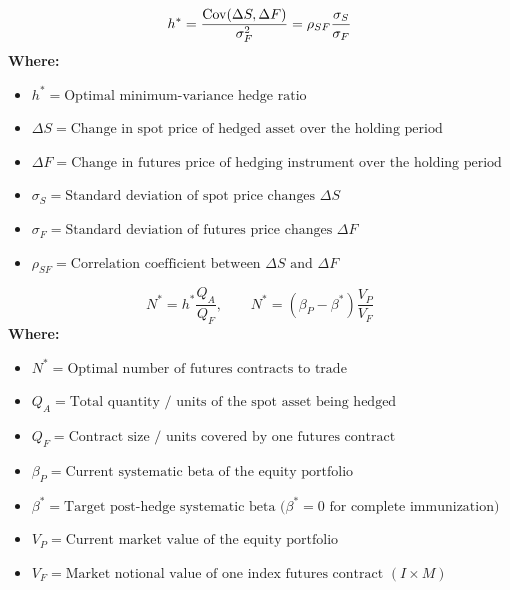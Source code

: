 \begin{formulabox}
\begin{equation}
h^* = \frac{\operatorname{Cov}(\Delta S, \Delta F)}{\sigma_F^2} = \rho_{SF} \frac{\sigma_S}{\sigma_F}
\end{equation}
\textbf{Where:}
\begin{itemize}[noitemsep, topsep=2pt]
    \item $h^* = \text{Optimal minimum-variance hedge ratio}$
    \item $\Delta S = \text{Change in spot price of hedged asset over the holding period}$
    \item $\Delta F = \text{Change in futures price of hedging instrument over the holding period}$
    \item $\sigma_S = \text{Standard deviation of spot price changes } \Delta S$
    \item $\sigma_F = \text{Standard deviation of futures price changes } \Delta F$
    \item $\rho_{SF} = \text{Correlation coefficient between } \Delta S \text{ and } \Delta F$
\end{itemize}
\end{formulabox}

\begin{formulabox}
\begin{equation}
N^* = h^* \frac{Q_A}{Q_F}, \qquad N^* = (\beta_P - \beta^*) \frac{V_P}{V_F}
\end{equation}
\textbf{Where:}
\begin{itemize}[noitemsep, topsep=2pt]
    \item $N^* = \text{Optimal number of futures contracts to trade}$
    \item $Q_A = \text{Total quantity / units of the spot asset being hedged}$
    \item $Q_F = \text{Contract size / units covered by one futures contract}$
    \item $\beta_P = \text{Current systematic beta of the equity portfolio}$
    \item $\beta^* = \text{Target post-hedge systematic beta ($\beta^* = 0$ for complete immunization)}$
    \item $V_P = \text{Current market value of the equity portfolio}$
    \item $V_F = \text{Market notional value of one index futures contract } (I \times M)$
\end{itemize}
\end{formulabox}

